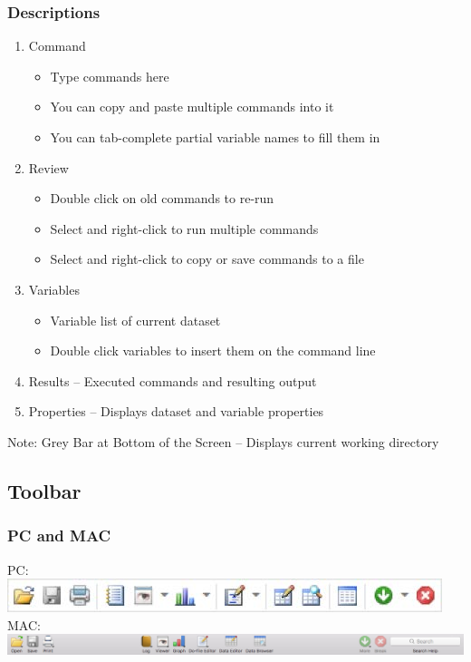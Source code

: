 \documentclass{beamer}
\begin{document}
\begin{frame}
	\frametitle{Descriptions}
		\begin{enumerate}
			\item Command
				\begin{itemize}
					\item Type commands here
					\item You can copy and paste multiple commands into it
					\item You can tab-complete partial variable names to fill them in
				\end{itemize}
			\item Review
				\begin{itemize}
					\item Double click on old commands to re-run
					\item Select and right-click to run multiple commands
					\item Select and right-click to copy or save commands to a file
				\end{itemize}
			\item Variables
				\begin{itemize}
					\item Variable list of current dataset
					\item Double click variables to insert them on the command line
				\end{itemize}
			\item Results -- Executed commands and resulting output
			\item Properties -- Displays dataset and variable properties
		\end{enumerate}
		Note: Grey Bar at Bottom of the Screen -- Displays current working directory
\end{frame}

\subsection{Toolbar}

\begin{frame}
	\frametitle{PC and MAC}
		PC: \includegraphics[scale=0.75]{toolbar_pc} \\
		MAC: \includegraphics[scale=0.25]{toolbar_mac}
\end{frame}
\end{document}
